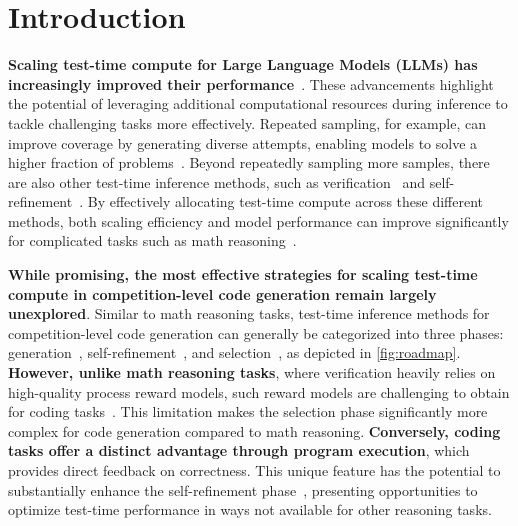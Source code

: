 \section{Introduction}
\textbf{Scaling test-time compute for Large Language Models (LLMs) has increasingly improved their performance}~\citep{openai_learning_to_reason_2024, snell2024scaling, deepseek_r1_lite_2024}. These advancements highlight the potential of leveraging additional computational resources during inference to tackle challenging tasks more effectively. Repeated sampling, for example, can improve coverage by generating diverse attempts, enabling models to solve a higher fraction of problems~\citep{brown2024large}. Beyond repeatedly sampling more samples, there are also other test-time inference methods, such as verification~\citep{} and self-refinement~\citep{madaan2024self}. By effectively allocating test-time compute across these different methods, both scaling efficiency and model performance can improve significantly for complicated tasks such as math reasoning~\citep{snell2024scaling}.


\textbf{While promising, the most effective strategies for scaling test-time compute in competition-level code generation remain largely unexplored}. Similar to math reasoning tasks, test-time inference methods for competition-level code generation can generally be categorized into three phases: generation~\citep{}, self-refinement~\citep{}, and selection~\citep{}, as depicted in \cref{fig:roadmap}. \textbf{However, unlike math reasoning tasks}, where verification heavily relies on high-quality process reward models, such reward models are challenging to obtain for coding tasks~\citep{}. This limitation makes the selection phase significantly more complex for code generation compared to math reasoning. \textbf{Conversely, coding tasks offer a distinct advantage through program execution}, which provides direct feedback on correctness. This unique feature has the potential to substantially enhance the self-refinement phase~\citep{chen2023teaching}, presenting opportunities to optimize test-time performance in ways not available for other reasoning tasks.


